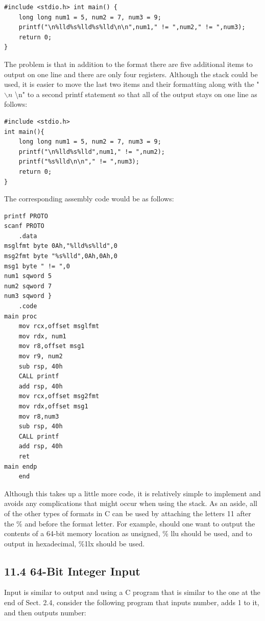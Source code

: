 \documentclass[10pt]{book}
\begin{document}
\begin{verbatim}
#include <stdio.h> int main() {
    long long num1 = 5, num2 = 7, num3 = 9;
    printf("\n%lld%s%lld%s%lld\n\n",num1," != ",num2," != ",num3);
    return 0;
}
\end{verbatim}

The problem is that in addition to the format there are five additional items to output on one line and there are only four registers. Although the stack could be used, it is easier to move the last two items and their formatting along with the " $\backslash n$ \textbackslash n" to a second printf statement so that all of the output stays on one line as follows:

\begin{verbatim}
#include <stdio.h>
int main(){
    long long num1 = 5, num2 = 7, num3 = 9;
    printf("\n%lld%s%lld",num1," != ",num2);
    printf("%s%lld\n\n"," != ",num3);
    return 0;
}
\end{verbatim}

The corresponding assembly code would be as follows:

\begin{verbatim}
printf PROTO
scanf PROTO
    .data
msglfmt byte 0Ah,"%lld%s%lld",0
msg2fmt byte "%s%lld",0Ah,0Ah,0
msg1 byte " != ",0
num1 sqword 5
num2 sqword 7
num3 sqword }
    .code
main proc
    mov rcx,offset msglfmt
    mov rdx, num1
    mov r8,offset msg1
    mov r9, num2
    sub rsp, 40h
    CALL printf
    add rsp, 40h
    mov rcx,offset msg2fmt
    mov rdx,offset msg1
    mov r8,num3
    sub rsp, 40h
    CALL printf
    add rsp, 40h
    ret
main endp
    end
\end{verbatim}

Although this takes up a little more code, it is relatively simple to implement and avoids any complications that might occur when using the stack. As an aside, all of the other types of formats in C can be used by attaching the letters 11 after the \% and before the format letter. For example, should one want to output the contents of a 64-bit memory location as unsigned, \% llu should be used, and to output in hexadecimal, \%1lx should be used.

\subsection*{11.4 64-Bit Integer Input}
Input is similar to output and using a C program that is similar to the one at the end of Sect. 2.4, consider the following program that inputs number, adds 1 to it, and then outputs number:
\end{document}
